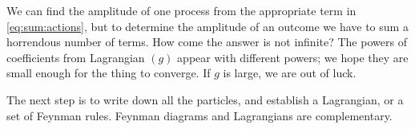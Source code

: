 \documentclass[]{article}
\begin{document}
We can find the amplitude of one process from the appropriate term in \eqref{eq:sum:actions}, but to determine the amplitude of an outcome we have to sum a horrendous number of terms. How come the answer is not infinite? The powers of coefficients from Lagrangian $(g)$ appear with different powers; we hope they are small enough for the thing to converge. If $g$ is large, we are out of luck.

The next step is to write down all the particles, and establish a Lagrangian, or a set of Feynman rules. Feynman diagrams and Lagrangians are complementary.

\printglossaries



\end{document}
